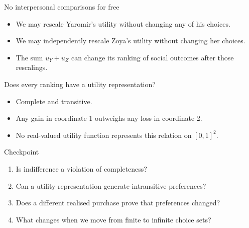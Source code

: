 \documentclass[handout,aspectratio=169,10pt]{beamer}
\begin{document}
\begin{frame}[label=interpersonal]{No interpersonal comparisons for free}

\begin{itemize}
\item We may rescale Yaromir's utility without changing any of his choices.
\item We may independently rescale Zoya's utility without changing her choices.
\item The sum $u_Y+u_Z$ can change its ranking of social outcomes after those rescalings.
\end{itemize}

\end{frame}

\begin{frame}[label=lexicographic]{Does every ranking have a utility representation?}



\begin{itemize}
\item Complete and transitive.
\item Any gain in coordinate 1 outweighs any loss in coordinate 2.
\item No real-valued utility function represents this relation on $[0,1]^2$.
\end{itemize}

\end{frame}

\begin{frame}[label=checkpoint]{Checkpoint}
\begin{enumerate}[<+->]
\item Is indifference a violation of completeness?
\item Can a utility representation generate intransitive preferences?
\item Does a different realised purchase prove that preferences changed?
\item What changes when we move from finite to infinite choice sets?
\end{enumerate}
\end{frame}
\end{document}
